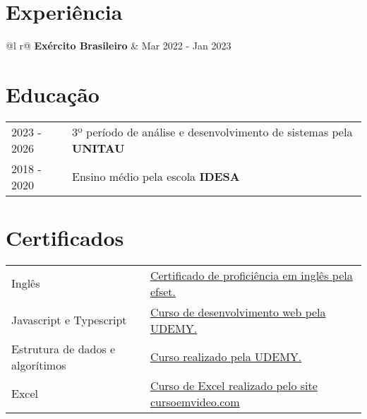 \documentclass[a4paper,12pt]{article}
\begin{document}
\section{Experiência}
\begin{tabularx}{\linewidth}{ @{}l r@{} }
\textbf{Exército Brasileiro} & \hfill Mar 2022 - Jan 2023 \\[3.75pt]
\end{tabularx}

\section{Educação}
\begin{tabularx}{\linewidth}{@{}l X@{}}	
2023 - 2026 & 3º período de análise e desenvolvimento de sistemas pela \textbf{UNITAU} \\ 
2018 - 2020 & Ensino médio pela escola \textbf{IDESA} \\
\end{tabularx}

\section{Certificados}
\begin{tabularx}{\linewidth}{@{}l X@{}}
Inglês &  \normalsize{\href{https://cert.efset.org/KdGLiQ}{Certificado de proficiência em inglês pela efset.}}\\
Javascript e Typescript  &  \normalsize{\href{https://udemy-certificate.s3.amazonaws.com/image/UC-6fc7d4af-701d-446a-b69b-8e167018a749.jpg?v=1706800581000}{Curso de desenvolvimento web pela UDEMY.}}\\  
Estrutura de dados e algorítimos &  \normalsize{\href{https://udemy-certificate.s3.amazonaws.com/image/UC-7074fe91-0541-4bfd-bc58-af41912a6361.jpg?v=1703254492000}{Curso realizado pela UDEMY.}}\\  
Excel & \normalsize{\href{https://www.cursoemvideo.com/certificates/certificado/?course_id=25933&cert-nonce=03d3237805}{Curso de Excel realizado pelo site cursoemvideo.com}}\\  
\end{tabularx}

\vfill
\end{document}
